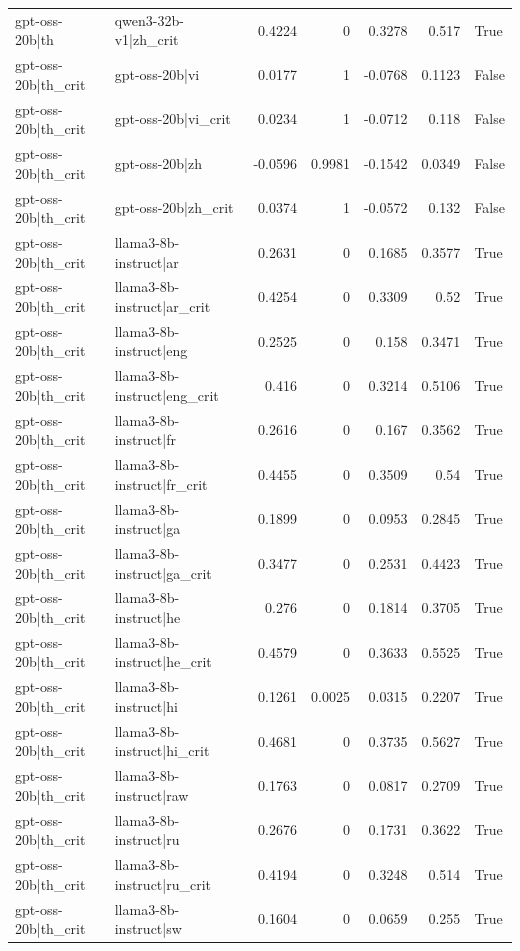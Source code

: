 \begin{table}
\begin{tabular}{l l r r r r l}
gpt-oss-20b|th & qwen3-32b-v1|zh_crit & 0.4224 & 0 & 0.3278 & 0.517 & True \\
gpt-oss-20b|th_crit & gpt-oss-20b|vi & 0.0177 & 1 & -0.0768 & 0.1123 & False \\
gpt-oss-20b|th_crit & gpt-oss-20b|vi_crit & 0.0234 & 1 & -0.0712 & 0.118 & False \\
gpt-oss-20b|th_crit & gpt-oss-20b|zh & -0.0596 & 0.9981 & -0.1542 & 0.0349 & False \\
gpt-oss-20b|th_crit & gpt-oss-20b|zh_crit & 0.0374 & 1 & -0.0572 & 0.132 & False \\
gpt-oss-20b|th_crit & llama3-8b-instruct|ar & 0.2631 & 0 & 0.1685 & 0.3577 & True \\
gpt-oss-20b|th_crit & llama3-8b-instruct|ar_crit & 0.4254 & 0 & 0.3309 & 0.52 & True \\
gpt-oss-20b|th_crit & llama3-8b-instruct|eng & 0.2525 & 0 & 0.158 & 0.3471 & True \\
gpt-oss-20b|th_crit & llama3-8b-instruct|eng_crit & 0.416 & 0 & 0.3214 & 0.5106 & True \\
gpt-oss-20b|th_crit & llama3-8b-instruct|fr & 0.2616 & 0 & 0.167 & 0.3562 & True \\
gpt-oss-20b|th_crit & llama3-8b-instruct|fr_crit & 0.4455 & 0 & 0.3509 & 0.54 & True \\
gpt-oss-20b|th_crit & llama3-8b-instruct|ga & 0.1899 & 0 & 0.0953 & 0.2845 & True \\
gpt-oss-20b|th_crit & llama3-8b-instruct|ga_crit & 0.3477 & 0 & 0.2531 & 0.4423 & True \\
gpt-oss-20b|th_crit & llama3-8b-instruct|he & 0.276 & 0 & 0.1814 & 0.3705 & True \\
gpt-oss-20b|th_crit & llama3-8b-instruct|he_crit & 0.4579 & 0 & 0.3633 & 0.5525 & True \\
gpt-oss-20b|th_crit & llama3-8b-instruct|hi & 0.1261 & 0.0025 & 0.0315 & 0.2207 & True \\
gpt-oss-20b|th_crit & llama3-8b-instruct|hi_crit & 0.4681 & 0 & 0.3735 & 0.5627 & True \\
gpt-oss-20b|th_crit & llama3-8b-instruct|raw & 0.1763 & 0 & 0.0817 & 0.2709 & True \\
gpt-oss-20b|th_crit & llama3-8b-instruct|ru & 0.2676 & 0 & 0.1731 & 0.3622 & True \\
gpt-oss-20b|th_crit & llama3-8b-instruct|ru_crit & 0.4194 & 0 & 0.3248 & 0.514 & True \\
gpt-oss-20b|th_crit & llama3-8b-instruct|sw & 0.1604 & 0 & 0.0659 & 0.255 & True \\

\end{tabular}
\end{table}
